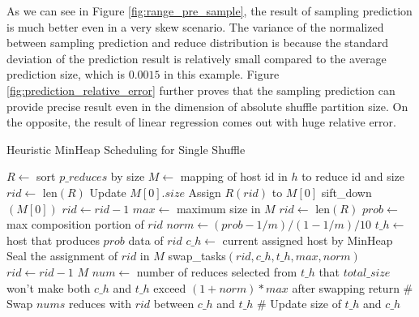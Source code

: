 As we can see in Figure \ref{fig:range_pre_sample}, the result of sampling prediction is much better even in a very skew scenario. The variance of the normalized between sampling prediction and reduce distribution is because the standard deviation of the prediction result is relatively small compared to the average prediction size, which is $0.0015$ in this example. Figure \ref{fig:prediction_relative_error} further proves that the sampling prediction can provide precise result even in the dimension of absolute shuffle partition size. On the opposite, the result of linear regression comes out with huge relative error.
\begin{minipage}{\linewidth}
\begin{algorithm}[H]
\caption{Heuristic MinHeap Scheduling for Single Shuffle}
\label{hminheap}
	\begin{algorithmic}[1]
	\small
		\State $R\gets$ sort $p\_reduces$ by size
		\State $M\gets$ mapping of host id in $h$ to reduce id and size
		\State $rid\gets$ len$\left(R\right)$
		\State Update $M\left[0\right].size$
		\State Assign $R\left(rid\right)$ to $M\left[0\right]$
		\State sift\_down$\left(M\left[0\right]\right)$
		\State
		\State $rid\gets rid-1$
		\EndWhile
		\State $max\gets$ maximum size in $M$
		\State $rid\gets$ len$\left(R\right)$
		\State $prob\gets$ max composition portion of $rid$
		\State $norm\gets \left(prob-1/m\right)/\left(1-1/m\right)/10$
		\State
		\State $t\_h\gets$ host that produces $prob$ data of $rid$
		\State $c\_h\gets$ current assigned host by MinHeap
			\State Seal the assignment of $rid$ in $M$
		\Else
			\State swap\_tasks$\left(rid, c\_h, t\_h, max, norm\right)$
		\EndIf
		\State $rid\gets rid-1$
		\EndWhile
		\Return $M$
	\EndProcedure
	\State $num\gets$ number of reduces
	\State selected from $t\_h$ that $total\_size$ won't
	\State make both $c\_h$ and $t\_h$ exceed $\left(1+norm\right)*max$
	\State after swapping
		\State return
	\Else
		\State \# Swap $nums$ reduces with $rid$ between $c\_h$ and $t\_h$
		\State \# Update size of $t\_h$ and $c\_h$
	\EndIf
	\EndProcedure
	\end{algorithmic}
\end{algorithm}
\end{minipage}


